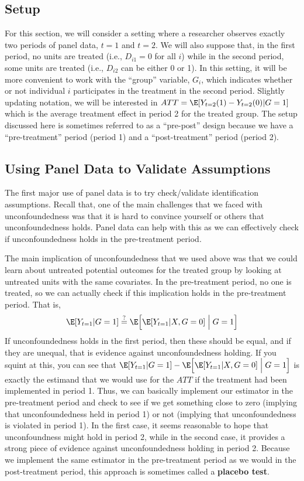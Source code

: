 \documentclass[
  letterpaper,
  DIV=11,
  numbers=noendperiod]{scrreprt}
\begin{document}
\subsection{Setup}\label{setup-1}

For this section, we will consider a setting where a researcher observes
exactly two periods of panel data, \(t=1\) and \(t=2\). We will also
suppose that, in the first period, no units are treated (i.e.,
\(D_{i1} = 0\) for all \(i\)) while in the second period, some units are
treated (i.e., \(D_{i2}\) can be either 0 or 1). In this setting, it
will be more convenient to work with the ``group'' variable, \(G_i\),
which indicates whether or not individual \(i\) participates in the
treatment in the second period. Slightly updating notation, we will be
interested in \(ATT = \E[Y_{t=2}(1) - Y_{t=2}(0) | G=1]\) which is the
average treatment effect in period 2 for the treated group. The setup
discussed here is sometimes referred to as a ``pre-post'' design because
we have a ``pre-treatment'' period (period 1) and a ``post-treatment''
period (period 2).

\subsection{Using Panel Data to Validate
Assumptions}\label{using-panel-data-to-validate-assumptions}

The first major use of panel data is to try check/validate
identification assumptions. Recall that, one of the main challenges that
we faced with unconfoundedness was that it is hard to convince yourself
or others that unconfoundedness holds. Panel data can help with this as
we can effectively check if unconfoundedness holds in the pre-treatment
period.

The main implication of unconfoundedness that we used above was that we
could learn about untreated potential outcomes for the treated group by
looking at untreated units with the same covariates. In the
pre-treatment period, no one is treated, so we can actually check if
this implication holds in the pre-treatment period. That is,
\begin{align*}
  \E[Y_{t=1} | G=1] \stackrel{?}{=} \E\Big[ \E[Y_{t=1} | X, G=0] \Bigm| G=1 \Big]
\end{align*} If unconfoundedness holds in the first period, then these
should be equal, and if they are unequal, that is evidence against
unconfoundedness holding. If you squint at this, you can see that
\(\E[Y_{t=1} | G=1] - \E\Big[ \E[Y_{t=1} | X, G=0] \Bigm| G=1 \Big]\) is
exactly the estimand that we would use for the \(ATT\) if the treatment
had been implemented in period 1. Thus, we can basically implement our
estimator in the pre-treatment period and check to see if we get
something close to zero (implying that unconfoundedness held in period
1) or not (implying that unconfoundedness is violated in period 1). In
the first case, it seems reasonable to hope that unconfoundness might
hold in period 2, while in the second case, it provides a strong piece
of evidence against unconfoundedness holding in period 2. Because we
implement the same estimator in the pre-treatment period as we would in
the post-treatment period, this approach is sometimes called a
\textbf{placebo test}.
\end{document}
